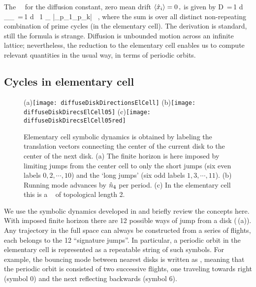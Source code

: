 \documentclass[aps,pre,
                showpacs,
                twocolumn,
                groupedaddress,
                floatfix]{revtex4-1}
\begin{document}
The \dzeta\ \cycForm\ for the diffusion constant, zero mean drift
$ \left\langle { \hat{x}_i } \right\rangle = 0 \,, $ is given by
 \beq D \,=\,{1  d}
{ _\zeta \over \expct{\period{}}_\zeta } \,=\,{1
   d } \, {1 \over \expct{\period{}}_\zeta} \sumprime
{}
{|\ExpaEig_{p_1}\cdots \ExpaEig_{p_k}|} \, ,
\label{eq-ecDiffCoef}
\eeq
where the sum is over all distinct non-repeating combination of prime cycles (in
the elementary cell). The derivation is standard, still the formula is strange.
Diffusion is unbounded motion across an infinite lattice; nevertheless, the
reduction to the elementary cell enables us to compute relevant quantities in
the usual way, in terms of periodic orbits.

\subsection{Cycles in elementary cell}
\begin{figure}
  \begin{center}
    (a)\texttt{[image: diffuseDiskDirectionsElCell]}
    (b)\texttt{[image: diffuseDiskDirecsElCell05]}
    (c)\texttt{[image: diffuseDiskDirecsElCell05red]}
  \end{center}
  \caption{ Elementary cell symbolic dynamics is obtained by labeling the
  translation vectors connecting the center of the current disk to the center of
  the next disk. (a) The finite horizon is here imposed by limiting jumps from
  the center cell to only the short jumps (six even labels $0, 2,\cdots,10$) and
  the `long jumps' (six odd labels $1, 3,\cdots,11$). (b) Running mode
   advances by $\hat n_4$ per period. (c) In the elementary cell this is
  a \po\  of topological length 2.  }
  \label{fig-diskDirectionsElCell}
\end{figure}

We use the symbolic dynamics developed in  and briefly review the
concepts here. With imposed finite horizon there are 12 possible ways of jump
from a disk (\,(a)). Any trajectory in the 
full space can always be constructed from a series of flights, each belongs to  
the 12 ``signature jumps''. In particular, a periodic orbit in the elementary 
cell is represented as a repeatable string of such symbols. For example, the 
bouncing mode between nearest disks is written as , meaning that 
the periodic orbit is consisted of two successive flights, one traveling 
towards right (symbol $0$) and the next reflecting backwards (symbol $6$). 
\end{document}
